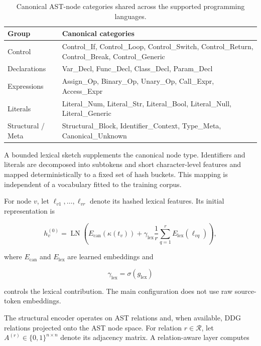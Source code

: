 \documentclass[authoryear,final,5p,times,twocolumn]{elsarticle}
\theoremstyle{plain}
\begin{document}
\begin{table}[t]
\centering
\caption{Canonical AST-node categories shared across the supported programming
languages.}
\label{tab:canonical_categories}
\footnotesize
\renewcommand{\arraystretch}{1.12}
\begin{tabular}{p{}p{}}
\toprule
\textbf{Group} & \textbf{Canonical categories} \\
\midrule
Control &
Control\_If, Control\_Loop, Control\_Switch,
Control\_Return, Control\_Break, Control\_Generic
\\
Declarations &
Var\_Decl, Func\_Decl, Class\_Decl, Param\_Decl
\\
Expressions &
Assign\_Op, Binary\_Op, Unary\_Op,
Call\_Expr, Access\_Expr
\\
Literals &
Literal\_Num, Literal\_Str, Literal\_Bool,
Literal\_Null, Literal\_Generic
\\
Structural / Meta &
Structural\_Block, Identifier\_Context,
Type\_Meta, Canonical\_Unknown
\\
\bottomrule
\end{tabular}
\end{table}

A bounded lexical sketch supplements the canonical node type. Identifiers and
literals are decomposed into subtokens and short character-level features and
mapped deterministically to a fixed set of hash buckets. This mapping is
independent of a vocabulary fitted to the training corpus.

For node $v$, let $\ell_{v1},\ldots,\ell_{vr}$ denote its hashed lexical
features. Its initial representation is

\begin{equation}
\label{eq:node_initial}
h_v^{(0)}
=
\operatorname{LN}
\left(
    E_{\mathrm{can}}
    \left(
        \kappa(t_v)
    \right)
    +
    \gamma_{\mathrm{lex}}
    \frac{1}{r}
    \sum_{q=1}^{r}
    E_{\mathrm{lex}}
    \left(
        \ell_{vq}
    \right)
\right),
\end{equation}

where $E_{\mathrm{can}}$ and $E_{\mathrm{lex}}$ are learned embeddings and

\begin{equation}
\gamma_{\mathrm{lex}}
=
\sigma(g_{\mathrm{lex}})
\end{equation}

controls the lexical contribution. The main configuration does not use raw
source-token embeddings.

The structural encoder operates on AST relations and, when available, DDG
relations projected onto the AST node space. For relation
$r\in\mathcal{R}$, let
$A^{(r)}\in\{0,1\}^{n\times n}$ denote its adjacency matrix. A relation-aware
layer computes
\end{document}
